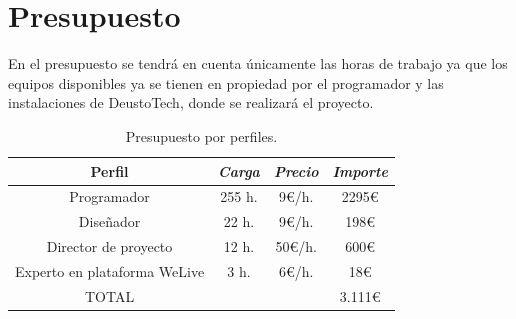 \documentclass{DeustoFDP}
\begin{document}
\chapter{Presupuesto}
En el presupuesto se tendrá en cuenta únicamente las horas de trabajo ya que los equipos disponibles ya se tienen en propiedad por el programador y las instalaciones de DeustoTech, donde se realizará el proyecto.
\begin{table}[H]
   	\centering
   	\caption{Presupuesto por perfiles.}\label{tab:presupuestoperfiles}
   	\begin{tabular}{cccc}
   		\toprule
   		\textbf{Perfil} & \emph{Carga} & \emph{Precio} & \emph{Importe}\\
   		\midrule
   		Programador  & 255 h.     & 9€/h. & 2295€ \\
   		Diseñador   & 22 h.     & 9€/h. & 198€ \\
   		Director de proyecto & 12 h.     & 50€/h.  & 600€ \\
   		Experto en plataforma WeLive & 3 h.     & 6€/h. & 18€ \\
   		TOTAL & & & 3.111€\\
   		\bottomrule
   	\end{tabular}
\end{table}
     

\printbibliography[heading=bibintoc]

\appendix

\backmatter
\end{document}
